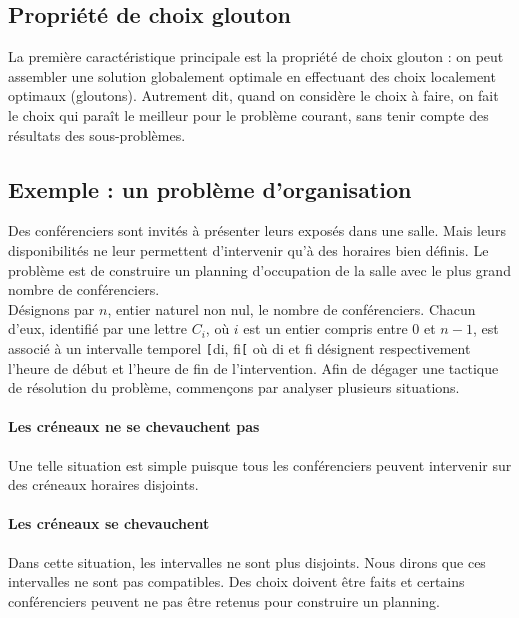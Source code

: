 \subsection{Propriété de choix glouton}

La première caractéristique principale est la propriété de choix glouton : on peut assembler une solution globalement optimale en effectuant des choix localement optimaux (gloutons). Autrement dit, quand on considère le choix à faire, on fait le choix qui paraît le meilleur pour le problème courant, sans tenir compte des résultats des sous-problèmes.


\subsection{Exemple : un problème d'organisation }



Des conférenciers sont invités à présenter leurs exposés dans une salle. Mais leurs disponibilités ne leur permettent d'intervenir qu'à des horaires bien définis. Le problème est de construire un planning d'occupation de la salle avec le plus grand nombre de conférenciers.\\
Désignons par $n$, entier naturel non nul, le nombre de conférenciers. Chacun d'eux, identifié par une lettre $C_i$, où $i$ est un entier compris entre 0 et $n-1$, est associé à un intervalle temporel \verb![!di, fi\verb![! où di et fi désignent respectivement l'heure de début et l'heure de fin de l'intervention. Afin de dégager une tactique de résolution du problème, commençons par analyser plusieurs situations.

\paragraph*{Les créneaux ne se chevauchent pas}

Une telle situation est simple puisque tous les conférenciers peuvent intervenir sur des créneaux horaires disjoints.

\paragraph*{Les créneaux se chevauchent}

Dans cette situation, les intervalles ne sont plus disjoints. Nous dirons que ces intervalles ne sont pas compatibles. Des choix doivent être faits et certains conférenciers peuvent ne pas être retenus pour construire un planning.







